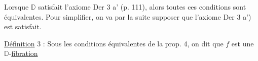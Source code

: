 Lorsque $\mathbb D$ satisfait l'axiome Der 3 a' (p. 111), alors toutes ces conditions  sont équivalentes.  Pour simplifier, on va par la suite supposer que l'axiome Der 3 a') est satisfait.

\uline{Définition} 3 : Sous les conditions équivalentes  de la prop. 4, on dit que $f$ est une $\mathbb D$-\uline{fibration}

